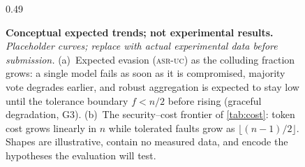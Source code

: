 \begin{figure}[t]
\begin{subcaptionblock}{0.49\textwidth}
\caption{Security--cost frontier.}
\label{fig:results-b}
\end{subcaptionblock}
\caption{\textbf{Conceptual expected trends; not experimental results.} \emph{Placeholder
curves; replace with actual experimental data before submission.} (a)~Expected evasion
(\textsc{asr-uc}) as the colluding fraction grows: a single model fails as soon as it is
compromised, majority vote degrades earlier, and robust aggregation is expected to stay low
until the tolerance boundary $f<n/2$ before rising (graceful degradation, G3). (b)~The
security--cost frontier of \cref{tab:cost}: token cost grows linearly in $n$ while tolerated
faults grow as $\lfloor(n-1)/2\rfloor$. Shapes are illustrative, contain no measured data,
and encode the hypotheses the evaluation will test.}
\label{fig:results}
\end{figure}
